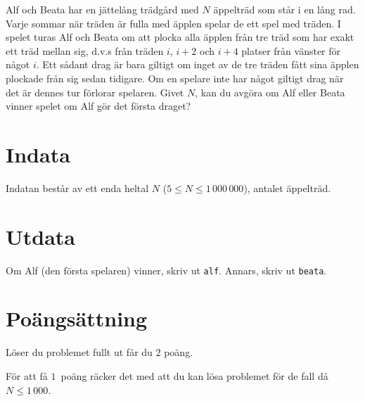 Alf och Beata har en jättelång trädgård med $N$ äppelträd som står i en lång rad.
Varje sommar när träden är fulla med äpplen spelar de ett spel med träden.
I spelet turas Alf och Beata om att plocka alla äpplen från tre träd som har exakt ett träd mellan sig, d.v.s från träden $i$, $i + 2$ och $i + 4$ platser från vänster för något $i$.
Ett sådant drag är bara giltigt om inget av de tre träden fått sina äpplen plockade från sig sedan tidigare.
Om en spelare inte har något giltigt drag när det är dennes tur förlorar spelaren.
Givet $N$, kan du avgöra om Alf eller Beata vinner spelet om Alf gör det första draget?

\section*{Indata}
Indatan består av ett enda heltal $N$ ($5 \le N \le 1\,000\,000$), antalet äppelträd.

\section*{Utdata}
Om Alf (den första spelaren) vinner, skriv ut \texttt{alf}.
Annars, skriv ut \texttt{beata}.

\section*{Poängsättning}
Löser du problemet fullt ut får du $2$ poäng.

För att få $1$ poäng räcker det med att du kan lösa problemet för de fall då $N \le 1\,000$.
